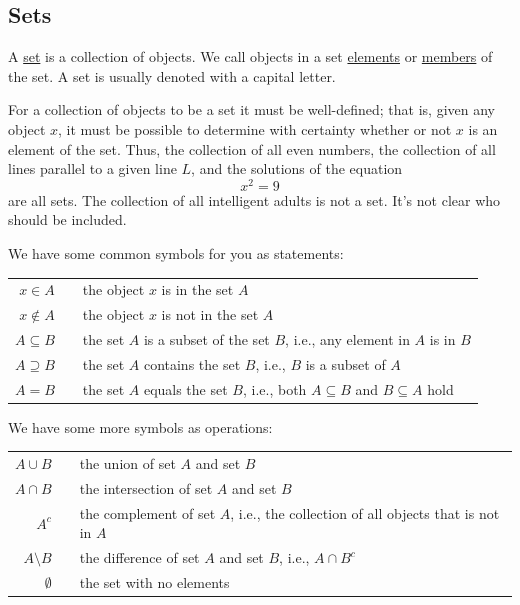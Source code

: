 \documentclass[11pt]{book}
\begin{document}
\subsection*{Sets}

\begin{definition}[Set]
    A \underline{set} is a collection of objects. We call objects in a set \underline{elements} or \underline{members} of the set. A set is usually denoted with a capital letter.
\end{definition}

For a collection of objects to be a set it must be well-defined; that is, given any object $x$, it must be possible to determine with certainty whether or not $x$ is an element of the set. Thus, the collection of all even numbers, the collection of all lines parallel to a given line $L$, and the solutions of the equation $$x^2 = 9$$ are all sets. The collection of all intelligent adults is not a set. It's not clear who should be included.

\begin{notation}
    We have some common symbols for you as statements:
    \begin{center}
        \begin{tabular}{rcl}
            $x\in A$ && the object $x$ is in the set $A$\\
            $x\notin A$ && the object $x$ is not in the set $A$\\
            $A\subseteq B$ && the set $A$ is a subset of the set $B$, i.e., any element in $A$ is in $B$\\
            $A\supseteq B$ && the set $A$ contains the set $B$, i.e., $B$ is a subset of $A$\\
            $A=B$ && the set $A$ equals the set $B$, i.e., both $A\subseteq B$ and $B\subseteq A$ hold
        \end{tabular}
    \end{center}
    We have some more symbols as operations:
    \begin{center}
        \begin{tabular}{rcl}
            $A\cup B$ && the union of set $A$ and set $B$\\
            $A\cap B$ && the intersection of set $A$ and set $B$\\
            $A^c$ && the complement of set $A$, i.e., the collection of all objects that is not in $A$\\
            $A\setminus B$ && the difference of set $A$ and set $B$, i.e., $A\cap B^c$\\
            $\emptyset$ && the set with no elements
        \end{tabular}
    \end{center}
\end{notation}
\end{document}
